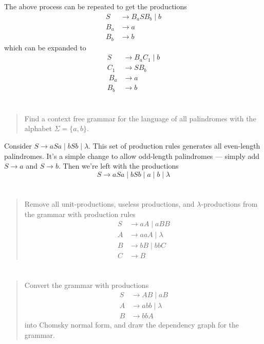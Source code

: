 \documentclass{article}
\begin{document}
The above process can be repeated to get the productions
\begin{align*}
    S   & \to B_a S B_b \mid b \\
    B_a & \to a                \\
    B_b & \to b
\end{align*}
which can be expanded to
\begin{align*}
    S   & \to B_a C_1 \mid b \\
    C_1 & \to S B_b          \\\
    B_a & \to a              \\
    B_b & \to b
\end{align*}

\section{}
\begin{quote}
    Find a context free grammar for the language of all palindromes with the alphabet $\Sigma = \{a, b\}$.
\end{quote}

Consider $S \to aSa \mid bSb \mid \lambda$.
This set of production rules generates all even-length palindromes.
It's a simple change to allow odd-length palindromes --- simply add $S \to a$ and $S \to b$.
Then we're left with the productions
\[S \to aSa \mid bSb \mid a \mid b \mid \lambda \]

\section{}
\begin{quote}
    Remove all unit-productions, useless productions, and $\lambda$-productions from the grammar with production rules
    \begin{align*}
        S & \to aA \mid aBB      \\
        A & \to aaA \mid \lambda \\
        B & \to bB \mid bbC      \\
        C & \to B
    \end{align*}
\end{quote}


\section{}
\begin{quote}
    Convert the grammar with productions
    \begin{align*}
        S & \to AB \mid aB       \\
        A & \to abb \mid \lambda \\
        B & \to bbA
    \end{align*}
    into Chomsky normal form, and draw the dependency graph for the grammar.
\end{quote}
\end{document}
